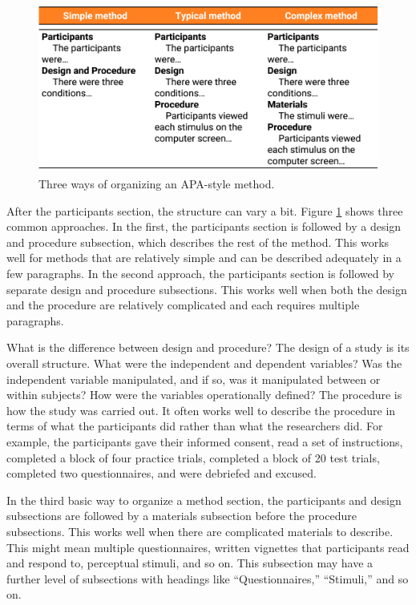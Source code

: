 \documentclass[
]{krantz}
\begin{document}
\begin{figure}

{\centering \includegraphics[width=0.7\linewidth]{images/ch11/method} 

}

\caption{Three ways of organizing an APA-style method.}\label{fig:method}
\end{figure}

After the participants section, the structure can vary a bit. Figure \ref{fig:method} shows three common approaches. In the first, the participants section is followed by a design and procedure subsection, which describes the rest of the method. This works well for methods that are relatively simple and can be described adequately in a few paragraphs. In the second approach, the participants section is followed by separate design and procedure subsections. This works well when both the design and the procedure are relatively complicated and each requires multiple paragraphs.

What is the difference between design and procedure? The design of a study is its overall structure. What were the independent and dependent variables? Was the independent variable manipulated, and if so, was it manipulated between or within subjects? How were the variables operationally defined? The procedure is how the study was carried out. It often works well to describe the procedure in terms of what the participants did rather than what the researchers did. For example, the participants gave their informed consent, read a set of instructions, completed a block of four practice trials, completed a block of 20 test trials, completed two questionnaires, and were debriefed and excused.

In the third basic way to organize a method section, the participants and design subsections are followed by a materials subsection before the procedure subsections. This works well when there are complicated materials to describe. This might mean multiple questionnaires, written vignettes that participants read and respond to, perceptual stimuli, and so on. This subsection may have a further level of subsections with headings like ``Questionnaires,'' ``Stimuli,'' and so on.
\end{document}

